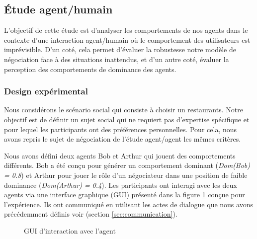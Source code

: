 {		\subsection{Étude agent/humain}
		
					L'objectif de cette étude est d'analyser les comportements de nos agents dans le contexte d'une interaction agent/humain où le comportement des utilisateurs est imprévisible. D'un coté, cela permet d'évaluer la robustesse notre modèle de négociation face à des situations inattendus, et d'un autre coté, évaluer la perception des comportements de dominance des agents. 
					
					
				\subsubsection{Design expérimental}
				
				Nous considérons le scénario social qui consiste à choisir un restaurants. Notre objectif est de définir un sujet social qui ne requiert pas d'expertise spécifique et pour lequel les participants ont des préférences personnelles. Pour cela, nous avons repris le sujet de négociation de l'étude agent/agent les mêmes critères.
					
				Nous avons défini deux agents Bob et Arthur qui jouent des comportements différents. Bob a été conçu pour générer un comportement dominant (\textit{Dom(Bob) = 0.8}) et Arthur pour jouer le rôle d'un négociateur dans une position de faible dominance (\textit{Dom(Arthur) = 0.4}).
				Les participants ont interagi avec les deux agents via une interface graphique (GUI) présenté dans la figure \ref{fig:ihm} conçue pour l'expérience. Ils ont communiqué en utilisant les actes de dialogue que nous avons précédemment définis voir (section \ref {sec:communication}).
					
					\begin{figure}[t]
						\centering
						\caption{GUI d'interaction avec l'agent}
						\label{fig:ihm}
					\end{figure}
					
}
